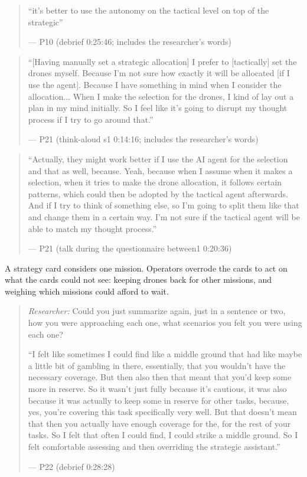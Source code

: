 \begin{quote}\small
``it's better to use the autonomy on the tactical level on top of the strategic''\par\hfill--- P10 (debrief 0:25:46; includes the researcher's words)
\end{quote}

\begin{quote}\small
``[Having manually set a strategic allocation] I prefer to [tactically] set the drones myself. Because I'm not sure how exactly it will be allocated [if I use the agent]. Because I have something in mind when I consider the allocation... When I make the selection for the drones, I kind of lay out a plan in my mind initially. So I feel like it's going to disrupt my thought process if I try to go around that.''\par\hfill--- P21 (think-aloud s1 0:14:16; includes the researcher's words)
\end{quote}

\begin{quote}\small
``Actually, they might work better if I use the AI agent for the selection and that as well, because. Yeah, because when I assume when it makes a selection, when it tries to make the drone allocation, it follows certain patterns, which could then be adopted by the tactical agent afterwards. And if I try to think of something else, so I'm going to split them like that and change them in a certain way. I'm not sure if the tactical agent will be able to match my thought process.''\par\hfill--- P21 (talk during the questionnaire between1 0:20:36)
\end{quote}


\label{sec:qual:hierarchy:cross-mission}
A strategy card considers one mission. Operators overrode the cards to act on what the cards could not see: keeping drones back for other missions, and weighing which missions could afford to wait.

\begin{quote}\small
{\footnotesize\textit{Researcher:} Could you just summarize again, just in a sentence or two, how you were approaching each one, what scenarios you felt you were using each one?}\par\smallskip
``I felt like sometimes I could find like a middle ground that had like maybe a little bit of gambling in there, essentially, that you wouldn't have the necessary coverage. But then also then that meant that you'd keep some more in reserve. So it wasn't just fully because it's cautious, it was also because it was actually to keep some in reserve for other tasks, because, yes, you're covering this task specifically very well. But that doesn't mean that then you actually have enough coverage for the, for the rest of your tasks. So I felt that often I could find, I could strike a middle ground. So I felt comfortable assessing and then overriding the strategic assistant.''\par\hfill--- P22 (debrief 0:28:28)
\end{quote}

